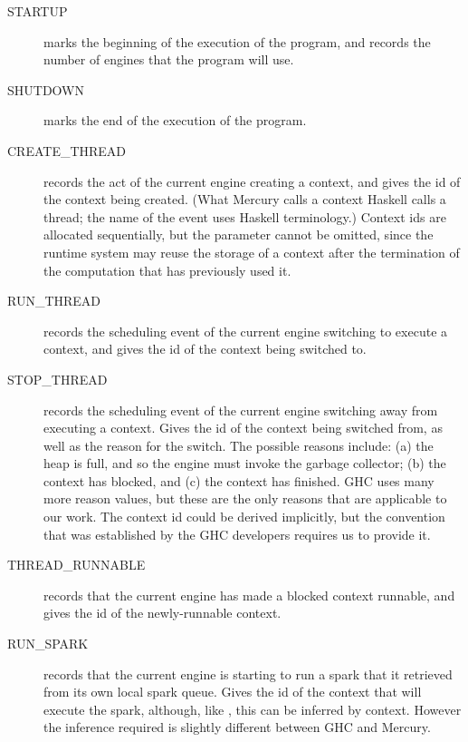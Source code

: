 \begin{description}

\item[STARTUP]
marks the beginning of the execution of the program,
and records the number of engines that the program will use.

\item[SHUTDOWN]
marks the end of the execution of the program.

\item[CREATE\_THREAD]
records the act of the current engine creating a context,
and gives the id of the context being created.
(What Mercury calls a context Haskell calls a thread;
the name of the event uses Haskell terminology.)
Context ids are allocated sequentially,
but the parameter cannot be omitted,
since the runtime system may reuse the storage of a context
after the termination of the computation that has previously used it.

\item[RUN\_THREAD]
records the scheduling event
of the current engine switching to execute a context,
and gives the id of the context being switched to.

\item[STOP\_THREAD]
records the scheduling event
of the current engine switching away from executing a context.
Gives the id of the context being switched from,
as well as the reason for the switch.
The possible reasons include:
(a) the heap is full, and so the engine must invoke the garbage collector;
(b) the context has blocked, and
(c) the context has finished.
GHC uses many more reason values, but these are the only reasons that
are applicable to our work.
The context id could be derived implicitly,
but the convention that was established by the GHC developers requires us to
provide it.

\item[THREAD\_RUNNABLE]
records that the current engine has made a blocked context runnable,
and gives the id of the newly-runnable context.

\item[RUN\_SPARK]
records that the current engine is starting to run a spark
that it retrieved from its own local spark queue.
Gives the id of the context that will execute the spark,
although, like , this can be inferred by context.
However the inference required is slightly different between GHC and Mercury.


\end{description}
